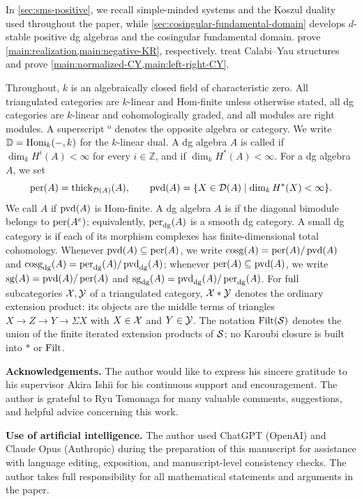 \documentclass[11pt,a4paper,dvipsnames,x11names]{amsart}
\begin{document}
In \cref{sec:sms-positive}, we recall simple-minded systems and the Koszul duality used throughout the paper, while \cref{sec:cosingular-fundamental-domain} develops $d$-stable positive dg algebras and the cosingular fundamental domain.  prove \cref{main:realization,main:negative-KR}, respectively.  treat Calabi--Yau structures and prove \cref{main:normalized-CY,main:left-right-CY}.

Throughout, $k$ is an algebraically closed field of characteristic zero. All triangulated categories are $k$-linear and Hom-finite unless otherwise stated, all dg categories are $k$-linear and cohomologically graded, and all modules are right modules. A superscript ${}^{\mathrm{o}}$ denotes the opposite algebra or category. We write $\mathbb D=\operatorname{Hom}_k(-,k)$ for the $k$-linear dual. A dg algebra $A$ is called  if $\dim_k H^i(A)<\infty$ for every $i\in\mathbb Z$, and  if $\dim_k H^*(A)<\infty$. For a dg algebra $A$, we set
\[
\operatorname{per}(A)=\operatorname{thick}_{\mathcal D(A)}(A),
\qquad
\operatorname{pvd}(A)=\{X\in\mathcal D(A)\mid \dim_k H^*(X)<\infty\}.
\]
We call $A$  if $\operatorname{pvd}(A)$ is Hom-finite. A dg algebra $A$ is  if the diagonal bimodule belongs to $\operatorname{per}(A^e)$; equivalently, $\operatorname{per}_{\mathrm{dg}}(A)$ is a smooth dg category. A small dg category is  if each of its morphism complexes has finite-dimensional total cohomology. Whenever $\operatorname{pvd}(A)\subseteq\operatorname{per}(A)$, we write $\operatorname{cosg}(A)=\operatorname{per}(A)/\operatorname{pvd}(A)$ and $\operatorname{cosg}_{\mathrm{dg}}(A)=\operatorname{per}_{\mathrm{dg}}(A)/\operatorname{pvd}_{\mathrm{dg}}(A)$; whenever $\operatorname{per}(A)\subseteq\operatorname{pvd}(A)$, we write $\operatorname{sg}(A)=\operatorname{pvd}(A)/\operatorname{per}(A)$ and $\operatorname{sg}_{\mathrm{dg}}(A)=\operatorname{pvd}_{\mathrm{dg}}(A)/\operatorname{per}_{\mathrm{dg}}(A)$. For full subcategories $\mathcal X,\mathcal Y$ of a triangulated category, $\mathcal X*\mathcal Y$ denotes the ordinary extension product: its objects are the middle terms of triangles $X\to Z\to Y\to\Sigma X$ with $X\in\mathcal X$ and $Y\in\mathcal Y$. The notation $\operatorname{Filt}(\mathcal S)$ denotes the union of the finite iterated extension products of $\mathcal S$; no Karoubi closure is built into $*$ or $\operatorname{Filt}$.

\par\medskip
\noindent
{\bf Acknowledgements.}
The author would like to express his sincere gratitude to his supervisor Akira Ishii for his continuous support and encouragement.
The author is grateful to Ryu Tomonaga for many valuable comments, suggestions, and helpful advice concerning this work.

\medskip
\noindent
{\bf Use of artificial intelligence.}
The author used ChatGPT (OpenAI) and Claude Opus (Anthropic) during the preparation of this manuscript for assistance with language editing, exposition, and manuscript-level consistency checks. The author takes full responsibility for all mathematical statements and arguments in the paper.
\end{document}

